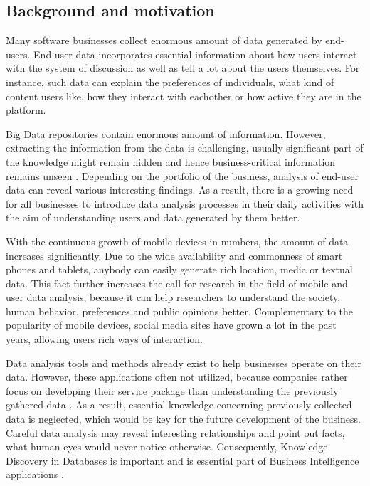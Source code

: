 \subsection{Background and motivation}
	Many software businesses collect enormous amount of data generated by end-users. End-user data incorporates essential information about how users interact with the system of discussion as well as tell a lot about the users themselves. For instance, such data can explain the preferences of individuals, what kind of content users like, how they interact with eachother or how active they are in the platform.
    
    Big Data repositories contain enormous amount of information. However, extracting the information from the data is challenging, usually significant part of the knowledge might remain hidden and hence business-critical information remains unseen \cite{inmon2007tapping, wegener2010integrating, introtodatamining}. Depending on the portfolio of the business, analysis of end-user data can reveal various interesting findings. As a result, there is a growing need for all businesses to introduce data analysis processes in their daily activities with the aim of understanding users and data generated by them better.
    
    With the continuous growth of mobile devices in numbers, the amount of data increases significantly. Due to the wide availability and commonness of smart phones and tablets, anybody can easily generate rich location, media or textual data. This fact further increases the call for research in the field of mobile and user data analysis, because it can help researchers to understand the society, human behavior, preferences and public opinions better. Complementary to the popularity of mobile devices, social media sites have grown a lot in the past years, allowing users rich ways of interaction.  

    Data analysis tools and methods already exist to help businesses operate on their data. However, these applications often not utilized, because companies rather focus on developing their service package than understanding the previously gathered data \cite{inmon2007tapping}. As a result, essential knowledge concerning previously collected data is neglected, which would be key for the future development of the business. Careful data analysis may reveal interesting relationships and point out facts, what human eyes would never notice otherwise. Consequently, Knowledge Discovery in Databases is important and is essential part of Business Intelligence applications \cite{zarsky2002mine}. 
    
